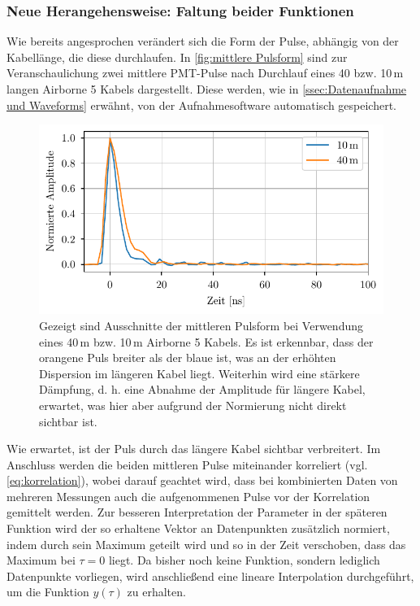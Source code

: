 \subsubsection{Neue Herangehensweise: Faltung beider Funktionen}
\label{sssec:Fitfunktion - Meine Herangehensweise}
Wie bereits angesprochen verändert sich die Form der Pulse, abhängig von der Kabellänge, die diese durchlaufen. 
In \autoref{fig:mittlere Pulsform} sind zur Veranschaulichung zwei mittlere PMT-Pulse nach Durchlauf eines 40 bzw. 10\,m langen Airborne 5 Kabels dargestellt. 
Diese werden, wie in \autoref{ssec:Datenaufnahme und Waveforms} erwähnt, von der Aufnahmesoftware automatisch gespeichert. 
\begin{figure}[h]
    \centering
    \includegraphics{images/Analysis/mean_pulseshapes.pdf}
    \caption{Gezeigt sind Ausschnitte der mittleren Pulsform bei Verwendung eines 40\,m bzw. 10\,m Airborne 5 Kabels. Es ist erkennbar, dass der orangene Puls breiter als der blaue ist, was an der erhöhten Dispersion im längeren Kabel liegt. Weiterhin wird eine stärkere Dämpfung, d. h. eine Abnahme der Amplitude für längere Kabel, erwartet, was hier aber aufgrund der Normierung nicht direkt sichtbar ist.}
    \label{fig:mittlere Pulsform}
\end{figure}
Wie erwartet, ist der Puls durch das längere Kabel sichtbar verbreitert. 
Im Anschluss werden die beiden mittleren Pulse miteinander korreliert (vgl. \autoref{eq:korrelation}), wobei darauf geachtet wird, dass bei kombinierten Daten von mehreren Messungen auch die aufgenommenen Pulse vor der Korrelation gemittelt werden. 
Zur besseren Interpretation der Parameter in der späteren Funktion wird der so erhaltene Vektor an Datenpunkten zusätzlich normiert, indem durch sein Maximum geteilt wird und so in der Zeit verschoben, dass das Maximum bei $\tau=0$ liegt. 
Da bisher noch keine Funktion, sondern lediglich Datenpunkte vorliegen, wird anschließend eine lineare Interpolation durchgeführt, um die Funktion $y(\tau)$ zu erhalten. 
